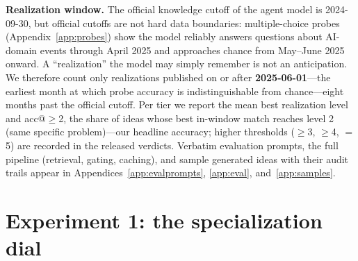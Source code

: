 \documentclass{article} %
\begin{document}
\textbf{Realization window.} The official knowledge cutoff of the agent
model is 2024-09-30, but official cutoffs are not hard data boundaries:
multiple-choice probes (Appendix~\ref{app:probes}) show the model
reliably answers questions about AI-domain events through April 2025 and
approaches chance from May--June 2025 onward. A ``realization'' the
model may simply remember is not an anticipation. We therefore count
only realizations published on or after \textbf{2025-06-01}---the
earliest month at which probe accuracy is indistinguishable from
chance---eight months past the official cutoff. Per tier we report the
mean best realization level and acc@$\geq$2, the share of ideas whose
best in-window match reaches level 2 (same specific problem)---our
headline accuracy; higher thresholds ($\geq$3, $\geq$4, $=$5) are
recorded in the released verdicts. Verbatim evaluation prompts, the
full pipeline (retrieval, gating, caching), and sample generated ideas
with their audit trails appear in
Appendices~\ref{app:evalprompts}, \ref{app:eval},
and~\ref{app:samples}.

\section{Experiment 1: the specialization dial}
\label{sec:dial}
\end{document}
